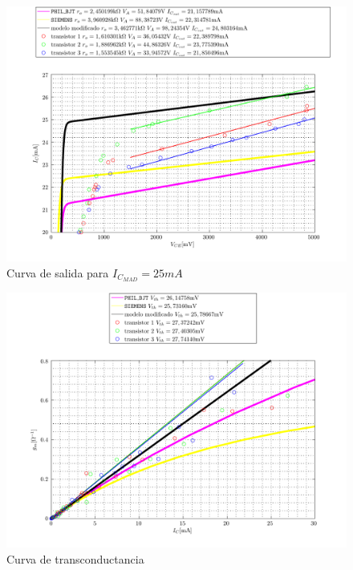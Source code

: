 \documentclass[10pt,spanish,a4paper,openany,notitlepage]{article}
\begin{document}
\begin{figure}[H] %
\begin{center}
\includegraphics[scale=0.7]{./Octave/IcvsVce_25mA.pdf}
\caption{Curva de salida para $I_{C_{MAD}} = 25\unit{mA}$}
 \label{fig:salida_25ma}
\end{center}
\end{figure}

\begin{figure}[H] %
\begin{center}
\includegraphics[scale=0.7]{./Octave/gm.pdf}
\caption{Curva de transconductancia}
 \label{fig:gm}
\end{center}
\end{figure}
\end{document}
